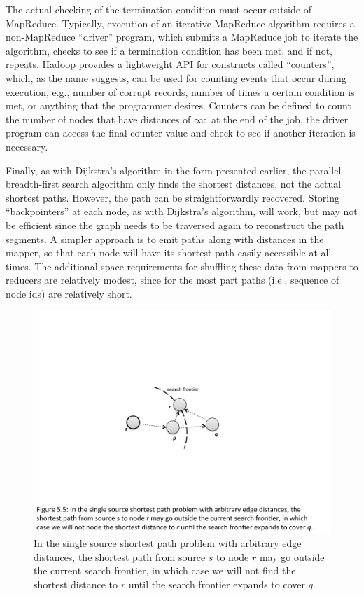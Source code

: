 The actual checking of the termination condition must occur outside of
MapReduce.  Typically, execution of an iterative MapReduce algorithm
requires a non-MapReduce ``driver'' program, which submits a MapReduce
job to iterate the algorithm, checks to see if a termination condition
has been met, and if not, repeats.  Hadoop provides a lightweight API
for constructs called ``counters'', which, as the name suggests, can be
used for counting events that occur during execution, e.g., number
of corrupt records, number of times a certain condition is met, or
anything that the programmer desires.  Counters can be defined to
count the number of nodes that have distances of $\infty$:\ at the end
of the job, the driver program can access the final counter value and
check to see if another iteration is necessary.

Finally, as with Dijkstra's algorithm in the form presented earlier,
the parallel breadth-first search algorithm only finds the shortest
distances, not the actual shortest paths.  However, the path can be
straightforwardly recovered.  Storing ``backpointers'' at each node,
as with Dijkstra's algorithm, will work, but may not be efficient
since the graph needs to be traversed again to reconstruct the path
segments.  A simpler approach is to emit paths along with distances in
the mapper, so that each node will have its shortest path easily
accessible at all times.  The additional space requirements for
shuffling these data from mappers to reducers are relatively modest,
since for the most part paths (i.e., sequence of node ids) are relatively short.

\begin{figure}[t]
\begin{center}
\includegraphics[scale=0.6]{figures/fig-ch5-search-frontier.pdf}
\end{center}
\caption{In the single source shortest path problem with arbitrary
  edge distances, the shortest path from source $s$ to node $r$ may go
  outside the current search frontier, in which case we will not find
  the shortest distance to $r$ until the search frontier expands to
  cover $q$.}
\label{figure:chapter-graphs:search-frontier}
\end{figure}

